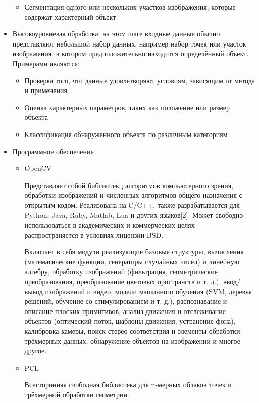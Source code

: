 \documentclass[a4paper,14pt]{extreport}
\begin{document}
\begin{itemize}
\begin{itemize}
		\item Сегментация одного или нескольких участков изображения, которые содержат характерный объект
	\end{itemize}
	\item Высокоуровневая обработка: на этом шаге входные данные обычно представляют небольшой набор данных, например набор точек или участок изображения, в котором предположительно находится определённый объект. Примерами являются:
	\begin{itemize}
		\item Проверка того, что данные удовлетворяют условиям, зависящим от метода и применения
		\item Оценка характерных параметров, таких как положение или размер объекта
		\item Классификация обнаруженного объекта по различным категориям
	\end{itemize}

	\item Программное обеспечение
	
	\begin{itemize}
		\item OpenCV
		
		Представляет собой библиотекц алгоритмов компьютерного зрения, обработки изображений и численных алгоритмов общего назначения с открытым кодом. Реализована на C/C++, также разрабатывается для Python, Java, Ruby, Matlab, Lua и других языков[2]. Может свободно использоваться в академических и коммерческих целях — распространяется в условиях лицензии BSD.
		
		Включает в себя модули реализующие базовые структуры, вычисления (математические функции, генераторы случайных чисел) и линейную алгебру, обработку изображений (фильтрация, геометрические преобразования, преобразование цветовых пространств и т. д.), ввод/вывод изображений и видео, модели машинного обучения (SVM, деревья решений, обучение со стимулированием и т. д.),  распознавание и описание плоских примитивов, анализ движения и отслеживание объектов (оптический поток, шаблоны движения, устранение фона),  калибровка камеры, поиск стерео-соответствия и элементы обработки трёхмерных данных, обнаружение объектов на изображении и многое другое.
		
		\item PCL
		
		 Всесторонняя свободная библиотека для n-мерных облаков точек и трёхмерной обработки геометрии.
		 
		 
	\end{itemize}

\end{itemize}
\end{document}
